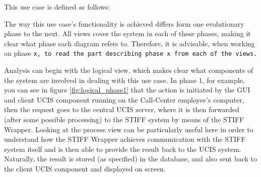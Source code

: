 This use case is defined as follows:
\begin{center}
\end{center}
The way this use case's functionality is achieved differs form one evolutionary phase to the next. All
views cover the system in each of these phases, making it clear what phase each diagram refers to.
Therefore, it is advisable, when working on phase \tt{x}\normalfont, to read the part describing phase
 \tt{x}\normalfont\ from each of the views.

Analysis can begin with the logical view, which makes clear what components of the system are involved
in dealing with this use case. In phase 1, for example, you can see in figure \ref{fig:logical_phase1} that the action
is initiated by the GUI and client UCIS component running on the Call-Center employee's computer, then
the request goes to the central UCIS server, where it is then forwarded (after some possible processing)
to the STIFF system by means of the STIFF Wrapper. Looking at the process view can be particularly
useful here in order to understand how the STIFF Wrapper achieves communication with the STIFF system
itself and is then able to provide the result back to the UCIS system. Naturally, the result is stored (as
specified) in the database, and also sent back to the client UCIS component and displayed on screen.

